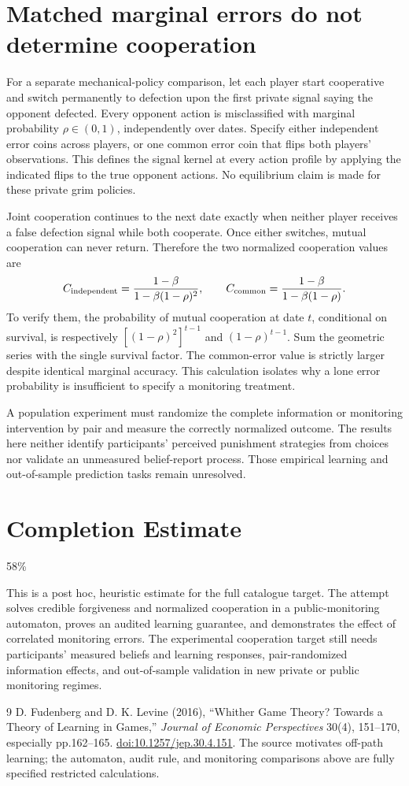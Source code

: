 \documentclass[11pt,a4paper]{article}
\theoremstyle{remark}
\begin{document}
\section{Matched marginal errors do not determine cooperation}
For a separate mechanical-policy comparison, let each player start cooperative and switch permanently to defection upon the first private signal saying the opponent defected. Every opponent action is misclassified with marginal probability $\rho\in(0,1)$, independently over dates. Specify either independent error coins across players, or one common error coin that flips both players' observations. This defines the signal kernel at every action profile by applying the indicated flips to the true opponent actions. No equilibrium claim is made for these private grim policies.

Joint cooperation continues to the next date exactly when neither player receives a false defection signal while both cooperate. Once either switches, mutual cooperation can never return. Therefore the two normalized cooperation values are
\[
 C_{\rm independent}=\frac{1-\beta}{1-\beta(1-\rho)^2},\qquad
 C_{\rm common}=\frac{1-\beta}{1-\beta(1-\rho)}.
\]
To verify them, the probability of mutual cooperation at date $t$, conditional on survival, is respectively $[(1-\rho)^2]^{t-1}$ and $(1-\rho)^{t-1}$. Sum the geometric series with the single survival factor. The common-error value is strictly larger despite identical marginal accuracy. This calculation isolates why a lone error probability is insufficient to specify a monitoring treatment.

A population experiment must randomize the complete information or monitoring intervention by pair and measure the correctly normalized outcome. The results here neither identify participants' perceived punishment strategies from choices nor validate an unmeasured belief-report process. Those empirical learning and out-of-sample prediction tasks remain unresolved.

\section{Completion Estimate}
58\%

This is a post hoc, heuristic estimate for the full catalogue target.
The attempt solves credible forgiveness and normalized cooperation in a public-monitoring automaton, proves an audited learning guarantee, and demonstrates the effect of correlated monitoring errors. The experimental cooperation target still needs participants' measured beliefs and learning responses, pair-randomized information effects, and out-of-sample validation in new private or public monitoring regimes.

\begin{thebibliography}{9}
 D. Fudenberg and D. K. Levine (2016), ``Whither Game Theory? Towards a Theory of Learning in Games,'' \emph{Journal of Economic Perspectives} 30(4), 151--170, especially pp.162--165. \href{https://doi.org/10.1257/jep.30.4.151}{doi:10.1257/jep.30.4.151}. The source motivates off-path learning; the automaton, audit rule, and monitoring comparisons above are fully specified restricted calculations.
\end{thebibliography}
\end{document}
